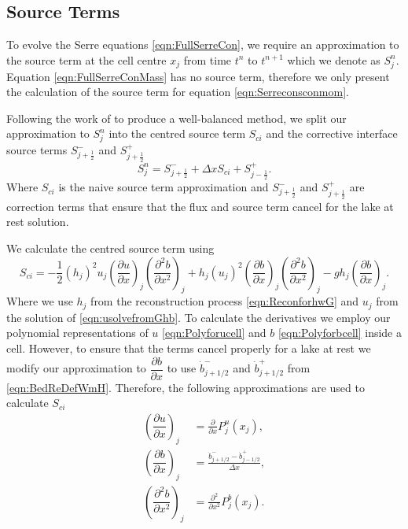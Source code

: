 \subsection{Source Terms}
To evolve the Serre equations \eqref{eqn:FullSerreCon}, we require an approximation to the source term at the cell centre $x_j$ from time $t^n$ to $t^{n+1}$ which we denote as $S^n_j$. Equation \eqref{eqn:FullSerreConMass} has no source term, therefore we only present the calculation of the source term for equation \eqref{eqn:Serreconsconmom}.

Following the work of \citet{Klein-etal-2004-2050} to produce a well-balanced method, we split our approximation to $S^n_j$ into the centred source term $S_{ci}$ and the corrective interface source terms $S^{-}_{j + \frac{1}{2}}$ and $S^{+}_{j + \frac{1}{2}}$
\begin{equation*}
S^n_j =  S^{-}_{j + \frac{1}{2}} + \Delta x S_{ci} + S^{+}_{j - \frac{1}{2}}.
\end{equation*}
Where $S_{ci}$ is the naive source term approximation and $S^{-}_{j + \frac{1}{2}}$ and $S^{+}_{j + \frac{1}{2}}$ are correction terms that ensure that the flux and source term cancel for the lake at rest solution. 

We calculate the centred source term using
\begin{equation*}
 S_{ci} = -\frac{1}{2}\left(h_j\right)^2 {u_j}\left( \frac{\partial {u}}{\partial x} \right)_j \left(\frac{\partial^2 b}{\partial x^2} \right)_j  + h_j \left(u_j\right)^2 \left(\frac{\partial b}{\partial x}\right)_j \left(\frac{\partial^2 b}{\partial x^2}\right)_j - gh_j\left(\frac{\partial b}{\partial x}\right)_j.
\end{equation*}
Where we use $h_j$ from the reconstruction process \eqref{eqn:ReconforhwG} and $u_j$ from the solution of \eqref{eqn:usolvefromGhb}. To calculate the derivatives we employ our polynomial representations of $u$ \eqref{eqn:Polyforucell} and $b$ \eqref{eqn:Polyforbcell} inside a cell. However, to ensure that the terms cancel properly for a lake at rest we modify our approximation to $\dfrac{\partial b}{\partial x}$ to use $\dot{b}^-_{j+1/2}$ and $\dot{b}^+_{j+1/2}$ from \eqref{eqn:BedReDefWmH}. Therefore, the following approximations are used to calculate $S_{ci}$
	\begin{align*}
	\left(\dfrac{\partial {u}}{\partial x} \right)_{j} &= \frac{\partial }{\partial x}P^u_j(x_{j}),  \\
\left(\dfrac{\partial {b}}{\partial x} \right)_{j} &=  \frac{\dot{b}^-_{j+1/2} - \dot{b}^+_{j-1/2}}{\Delta x} , \\	
	\left(\dfrac{\partial^2 {b}}{\partial x^2} \right)_{j} &= \frac{\partial^2 }{\partial x^2}P^b_j(x_{j}).
	\end{align*}

